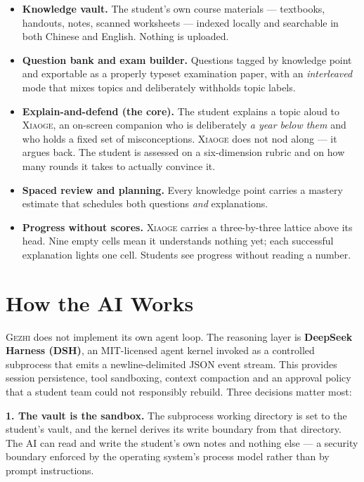 \documentclass[10pt,a4paper]{article}
\newcommand{\gezhi}{\textsc{Gezhi}}
\newcommand{\xiaoge}{\textsc{Xiaoge}}
\begin{document}
\begin{itemize}
  \item \textbf{Knowledge vault.} The student's own course materials --- textbooks,
  handouts, notes, scanned worksheets --- indexed locally and searchable in both Chinese
  and English. Nothing is uploaded.
  \item \textbf{Question bank and exam builder.} Questions tagged by knowledge point and
  exportable as a properly typeset examination paper, with an \emph{interleaved} mode that
  mixes topics and deliberately withholds topic labels.
  \item \textbf{Explain-and-defend (the core).} The student explains a topic aloud to
  \xiaoge{}, an on-screen companion who is deliberately \emph{a year below them} and who
  holds a fixed set of misconceptions. \xiaoge{} does not nod along --- it argues back. The
  student is assessed on a six-dimension rubric and on how many rounds it takes to actually
  convince it.
  \item \textbf{Spaced review and planning.} Every knowledge point carries a mastery
  estimate that schedules both questions \emph{and} explanations.
  \item \textbf{Progress without scores.} \xiaoge{} carries a three-by-three lattice above
  its head. Nine empty cells mean it understands nothing yet; each successful explanation
  lights one cell. Students see progress without reading a number.
\end{itemize}

\section{How the AI Works}

\gezhi{} does not implement its own agent loop. The reasoning layer is \textbf{DeepSeek
Harness (DSH)}, an MIT-licensed agent kernel invoked as a controlled subprocess that emits
a newline-delimited JSON event stream. This provides session persistence, tool sandboxing,
context compaction and an approval policy that a student team could not responsibly rebuild.
Three decisions matter most:

\textbf{1. The vault is the sandbox.} The subprocess working directory is set to the
student's vault, and the kernel derives its write boundary from that directory. The AI can
read and write the student's own notes and nothing else --- a security boundary enforced by
the operating system's process model rather than by prompt instructions.
\end{document}
